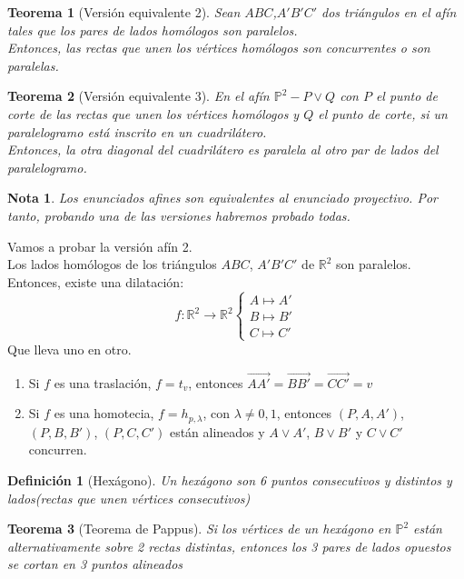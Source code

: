 \documentclass[11pt, a4paper]{article}
\makeatletter
\newif\IfInSansMode
\let\oldsf\sffamily
\renewcommand*{\sffamily}{\oldsf\mathversion{sans}\InSansModetrue}
\let\oldnorm\normalfont
\renewcommand*{\normalfont}{\oldnorm\InSansModefalse\mathversion{normal}}
\renewenvironment{proof}[1][\proofname] {\vspace{-15pt}\par\pushQED{\qed}\normalfont\topsep6\p@\@plus6\p@\relax\trivlist\item[\hskip\labelsep\it#1\@addpunct{.}]\ignorespaces}{\popQED\endtrivlist\@endpefalse}
\newcommand{\R}{\mathbb{R}}
\renewcommand{\vec}{\overrightarrow}
\renewenvironment{proof}[1][\proofname] {\par\pushQED{\qed}\normalfont\topsep6\p@\@plus6\p@\relax\trivlist\item[\hskip\labelsep\itshape\sffamily#1\@addpunct{.}]\ignorespaces}{\popQED\endtrivlist\@endpefalse}
\theoremstyle{theorem-style}
\newtheorem{nth}{Teorema}[section]
\theoremstyle{definition-style}
\newtheorem{ndef}{Definición}[section]
\theoremstyle{remark-style}
\newtheorem*{nota}{Nota}
\theoremstyle{example-style}
\makeatother
\begin{document}
\begin{nth}[Versión equivalente 2]
	Sean $ABC$,$A'B'C'$ dos triángulos en el afín tales que los pares de lados homólogos son paralelos.\\
	Entonces, las rectas que unen los vértices homólogos son concurrentes o son paralelas.
\end{nth}


\begin{nth}[Versión equivalente 3]
	En el afín $\mathbb P^2 - P\vee Q$ con $P$ el punto de corte de las rectas que unen los vértices homólogos y $Q$  el punto de corte, si un paralelogramo está inscrito en un cuadrilátero.\\
	Entonces, la otra diagonal del cuadrilátero es paralela al otro par de lados del paralelogramo.
\end{nth}

\begin{nota}
	Los enunciados afines son equivalentes al enunciado proyectivo. Por tanto, probando una de las versiones habremos probado todas.
\end{nota}
\begin{proof}
	Vamos a probar la versión afín 2.\\
	Los lados homólogos de los triángulos $ABC$, $A'B'C'$ de $\R^2$ son paralelos. Entonces, existe una dilatación:
	\[
	f: \R^2 \to \R^2 \begin{cases}
	A \mapsto A'\\
	B \mapsto B'\\
	C \mapsto C'
	
\end{cases}
	\]
	Que lleva uno en otro.
	\begin{enumerate}
	\item Si $f$ es una traslación, $f = t_v$, entonces $\vec{AA'}= \vec{BB'} = \vec{CC'}=v$
	\item Si $f$ es una homotecia, $f= h_{p,\lambda}$, con $\lambda \ne 0, 1$, entonces $(P,A,A')$, $(P,B,B')$, $(P,C,C')$ están alineados y $A\vee A'$, $B \vee B'$ y $C \vee C'$ concurren.
\end{enumerate}
\end{proof}

\begin{ndef}[Hexágono]
	Un hexágono son 6 puntos consecutivos y distintos y lados(rectas que unen vértices consecutivos)
\end{ndef}
\begin{nth}[Teorema de Pappus]
	Si los vértices de un hexágono en $\mathbb P^2$ están alternativamente sobre 2 rectas distintas, entonces los 3 pares de lados opuestos se cortan en 3 puntos alineados
\end{nth}
\end{document}
